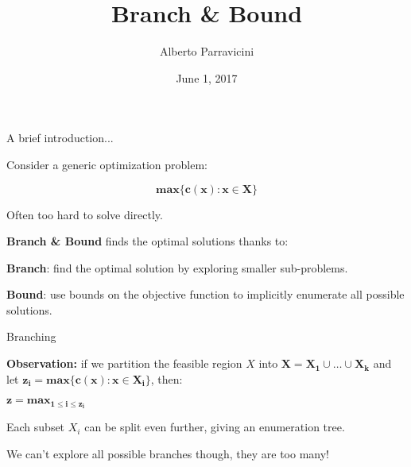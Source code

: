 \documentclass[13pt]{beamer}
\title{Branch \& Bound}
\author{Alberto Parravicini}
\institute{Université libre de Bruxelles}
\date{June 1, 2017}
\begin{document}
\begin{frame}[plain]
\maketitle
\end{frame}



\begin{frame}{A brief introduction...}  
    \begin{fullpageitemize}	
        \item<1->Consider a generic optimization problem:
        \item<2->$$\mathbf{max\{c(x): x \in X\}}$$
        \item<3->Often too hard to solve directly.
        \item<4->\textbf{Branch \& Bound} finds the optimal solutions thanks to:
        \begin{baseitemize}
            \item<5->[\rtarrow]\textbf{Branch}: find the optimal solution by exploring smaller sub-problems. 
            \item<6->[\rtarrow]\textbf{Bound}: use bounds on the objective function to implicitly enumerate all possible solutions.
        \end{baseitemize}	
    \end{fullpageitemize}
\end{frame}


\begin{frame}{Branching}
    \begin{fullpageitemize}
    \item<1->\textbf{Observation:} if we partition the feasible region $X$ into $\mathbf{X = X_1 \cup \ldots \cup X_k}$ and let $\mathbf{z_i = max\{c(x): x \in X_i\}}$, then:
    \item<2->[\rtarrow]$\mathbf{z = max_{1 \leq i \leq z_i}}$
    \item<3->Each subset $X_i$ can be split even further, giving an enumeration tree.
    \item<4->We can't explore all possible branches though, they are too many!   
    \end{fullpageitemize}
\end{frame}
\end{document}
